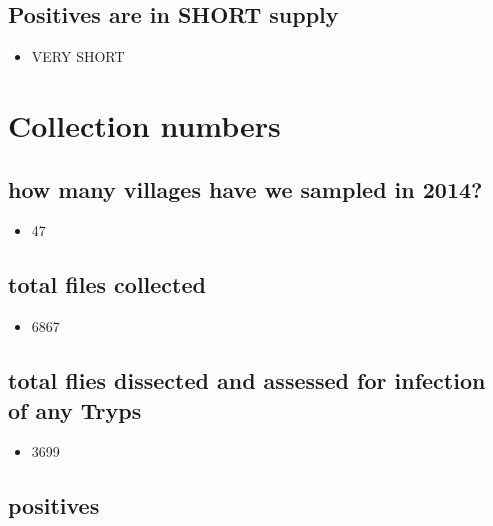 \documentclass[letterpaper]{scrartcl}
\begin{document}
\subsection{Positives are in SHORT
supply}\label{positives-are-in-short-supply}

\begin{itemize}
\itemsep1pt\parskip0pt
\item
  VERY SHORT
\end{itemize}

\section{Collection numbers}\label{collection-numbers}

\subsection{how many villages have we sampled in
2014?}\label{how-many-villages-have-we-sampled-in-2014}

\begin{itemize}
\itemsep1pt\parskip0pt
\item
  47
\end{itemize}

\subsection{total files collected}\label{total-files-collected}

\begin{itemize}
\itemsep1pt\parskip0pt
\item
  6867
\end{itemize}

\subsection{total flies dissected and assessed for infection of any
Tryps}\label{total-flies-dissected-and-assessed-for-infection-of-any-tryps}

\begin{itemize}
\itemsep1pt\parskip0pt
\item
  3699
\end{itemize}

\subsection{positives}\label{positives}
\end{document}
